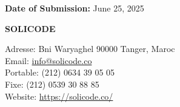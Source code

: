 \documentclass{report}
\begin{document}
\vspace{1.5cm}

\begin{flushleft} %
{\large\textbf{Date of Submission:}}
\vspace{0.3cm}
June 25, 2025
\end{flushleft}

\vspace*{\fill} %

\begin{center}
\textbf{SOLICODE}
\par
\small

\par
Adresse: Bni Waryaghel 90000 Tanger, Maroc\\
Email: \href{mailto:info@solicode.co}{info@solicode.co}\\
Portable: (212) 0634 39 05 05\\
Fixe: (212) 0539 30 88 85\\
Website: \url{https://solicode.co/}
\end{center}



\newpage
\end{document}
